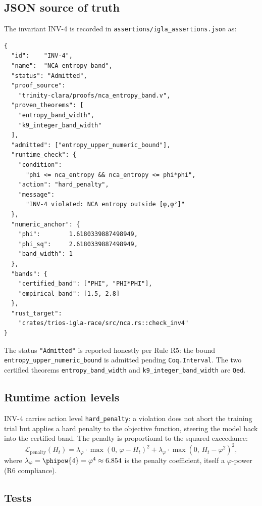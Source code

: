 \subsection{JSON source of truth}
\label{subsec:inv4-json}

The invariant INV-4 is recorded in
\texttt{assertions/igla\_assertions.json} as:
\begin{verbatim}
{
  "id":    "INV-4",
  "name":  "NCA entropy band",
  "status": "Admitted",
  "proof_source":
    "trinity-clara/proofs/nca_entropy_band.v",
  "proven_theorems": [
    "entropy_band_width",
    "k9_integer_band_width"
  ],
  "admitted": ["entropy_upper_numeric_bound"],
  "runtime_check": {
    "condition":
      "phi <= nca_entropy && nca_entropy <= phi*phi",
    "action": "hard_penalty",
    "message":
      "INV-4 violated: NCA entropy outside [φ,φ²]"
  },
  "numeric_anchor": {
    "phi":        1.6180339887498949,
    "phi_sq":     2.6180339887498949,
    "band_width": 1
  },
  "bands": {
    "certified_band": ["PHI", "PHI*PHI"],
    "empirical_band": [1.5, 2.8]
  },
  "rust_target":
    "crates/trios-igla-race/src/nca.rs::check_inv4"
}
\end{verbatim}

The status \texttt{"Admitted"} is reported honestly per Rule R5: the
bound \texttt{entropy\_upper\_numeric\_bound} is admitted pending
\texttt{Coq.Interval}.  The two certified theorems
\texttt{entropy\_band\_width} and \texttt{k9\_integer\_band\_width}
are \texttt{Qed}.

\subsection{Runtime action levels}
\label{subsec:inv4-action}

INV-4 carries action level \texttt{hard\_penalty}: a violation does
not abort the training trial but applies a hard penalty to the
objective function, steering the model back into the certified band.
The penalty is proportional to the squared exceedance:
\[
  \mathcal{L}_\mathrm{penalty}(H_t) =
  \lambda_\varphi \cdot \max(0,\, \varphi - H_t)^2
  + \lambda_\varphi \cdot \max(0,\, H_t - \varphi^2)^2,
\]
where \(\lambda_\varphi = \phipow{4} = \varphi^4 \approx 6.854\)
is the penalty coefficient, itself a \(\varphi\)-power (R6 compliance).

\subsection{Tests}
\label{subsec:inv4-tests}

